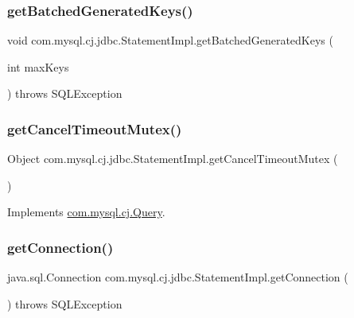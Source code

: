 \subsubsection{\texorpdfstring{get\+Batched\+Generated\+Keys()}{getBatchedGeneratedKeys()}\hspace{0.1cm}{\footnotesize\ttfamily [2/2]}}
{\footnotesize\ttfamily void com.\+mysql.\+cj.\+jdbc.\+Statement\+Impl.\+get\+Batched\+Generated\+Keys (\begin{DoxyParamCaption}\item[{int}]{max\+Keys }\end{DoxyParamCaption}) throws S\+Q\+L\+Exception\hspace{0.3cm}{\ttfamily [protected]}}

\mbox{\label{classcom_1_1mysql_1_1cj_1_1jdbc_1_1_statement_impl_a428c7f909851189bed9fdc590ee2e770}} 
\subsubsection{\texorpdfstring{get\+Cancel\+Timeout\+Mutex()}{getCancelTimeoutMutex()}}
{\footnotesize\ttfamily Object com.\+mysql.\+cj.\+jdbc.\+Statement\+Impl.\+get\+Cancel\+Timeout\+Mutex (\begin{DoxyParamCaption}{ }\end{DoxyParamCaption})}



Implements \mbox{\hyperlink{interfacecom_1_1mysql_1_1cj_1_1_query_af99b8945b78c6f6cec21d9a81e227d1e}{com.\+mysql.\+cj.\+Query}}.

\mbox{\label{classcom_1_1mysql_1_1cj_1_1jdbc_1_1_statement_impl_a5e4c41ddb78ca7533f4984c9f6c996c4}} 
\subsubsection{\texorpdfstring{get\+Connection()}{getConnection()}}
{\footnotesize\ttfamily java.\+sql.\+Connection com.\+mysql.\+cj.\+jdbc.\+Statement\+Impl.\+get\+Connection (\begin{DoxyParamCaption}{ }\end{DoxyParamCaption}) throws S\+Q\+L\+Exception}

